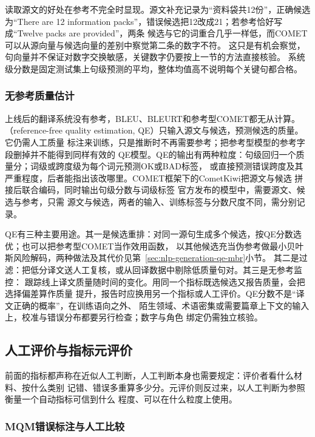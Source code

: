读取源文的好处在参考不完全时显现。源文补充记录为“资料袋共12份”，正确候选为“There are 12
information packs”，错误候选把12改成21；若参考恰好写成“Twelve packs are provided”，两条
候选与它的词重合几乎一样低，而COMET可以从源向量与候选向量的差别中察觉第二条的数字不符。
这只是有机会察觉，句向量并不保证对数字交换敏感，关键数字仍要按上一节的方法直接核验。
系统级分数是固定测试集上句级预测的平均，整体均值高不说明每个关键句都合格。

\subsubsection{无参考质量估计}
\label{sec:nlp-generation-qe}

上线后的翻译系统没有参考，BLEU、BLEURT和参考型COMET都无从计算。
（reference-free quality estimation, QE）只输入源文与候选，预测候选的质量。它仍需人工质量
标注来训练，只是推断时不再需要参考；把参考型模型的参考字段删掉并不能得到同样有效的
QE模型。QE的输出有两种粒度：句级回归一个质量分；词级或跨度级为每个词元预测OK或BAD标签，
或直接预测错误跨度及其严重程度，后者能指出该改哪里。COMET框架下的CometKiwi把源文与候选
拼接后联合编码，同时输出句级分数与词级标签
官方发布的模型中，需要源文、候选与参考，只需
源文与候选，两者的输入、训练标签与分数尺度不同，需分别记录。

QE有三种主要用途。其一是候选重排：对同一源句生成多个候选，按QE分数选优；也可以把参考型COMET当作效用函数，
以其他候选充当伪参考做最小贝叶斯风险解码，两种做法及其代价见第~\ref{sec:nlp-generation-qe-mbr}小节。
其二是过滤：把低分译文送人工复核，或从回译数据中剔除低质量句对。其三是无参考监控：
跟踪线上译文质量随时间的变化。用同一个指标既选候选又报告质量，会把选择偏差算作质量
提升，报告时应换用另一个指标或人工评价。QE分数不是“译文正确的概率”，在训练语向之外、
陌生领域、术语密集或需要篇章上下文的输入上，校准与错误分布都要另行检查；数字与角色
绑定仍需独立核验。

\subsection{人工评价与指标元评价}
\label{sec:nlp-generation-human-meta}

前面的指标都声称在近似人工判断，人工判断本身也需要规定：评价者看什么材料、按什么类别
记错、错误多重算多少分。元评价则反过来，以人工判断为参照衡量一个自动指标可信到什么
程度、可以在什么粒度上使用。

\subsubsection{MQM错误标注与人工比较}
\label{sec:nlp-generation-mqm}

